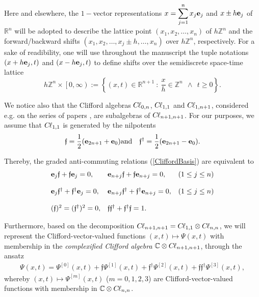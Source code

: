 \documentclass{elsarticle}
\newcommand{\BR}{{\mathbb R}}
\newcommand{\BC}{{\mathbb C}}
\newcommand{\BZ}{{\mathbb Z}}
\newcommand{\e}{{\bf e}}
\newcommand{\f}{{\mathfrak f}}
\newcommand{\cl}{C \kern -0.1em \ell}
\begin{document}
Here and elsewhere, the $1-$vector
representations $\displaystyle x=\sum_{j=1}^{n}x_j\e_j$ and $\displaystyle x\pm h
\e_j$ of $\BR^{n}$ will be adopted to describe
the lattice point $(x_1,x_2,\ldots,x_n)$ of $h\BZ^{n}$ and the
forward/backward shifts $(x_1,x_2,\ldots,x_j\pm h,\ldots, x_n)$ over
$h\BZ^n$, respectively. 
For a sake of readibility, one will use throughout the manuscript the tuple notations $(x+h\e_j,t)$ and $(x-h\e_j,t)$
to define shifts over the semidiscrete space-time lattice
$$h\BZ^n \times \left[0,\infty\right):=\left\{(x,t)\in \BR^{n+1}~:~\frac{x}{h}\in \BZ^n~~\wedge~~t\geq 0 \right\}.$$ 

We notice also that the Clifford algebras $\cl_{0,n}$, $\cl_{1,1}$ and $\cl_{1,n+1}$, considered e.g. on the series of papers \cite{CKS05,B06,FV16,FV17,BCBM20}, are subalgebras of $\cl_{n+1,n+1}$. For our purposes, we assume that $\cl_{1,1}$ is generated by the nilpotents
\begin{eqnarray}
	\label{WittBasis}	\f=\frac{1}{2}(\e_{2n+1}+\e_0) & \mbox{and} & \f^\dagger=\frac{1}{2}(\e_{2n+1}-\e_0).
\end{eqnarray} 

Thereby, the graded anti-commuting relations (\ref{CliffordBasis}) are equivalent to
\begin{eqnarray}
	\label{CliffordWittBasis}
	\begin{array}{lll}
		\e_j  \f+\f \e_j=0, & \e_{n+j} \f+\f \e_{n+j}=0, &(1\leq j\leq n)\\ \ \\
		\e_j  \f^\dagger+\f^\dagger \e_j=0, & \e_{n+j} \f^\dagger +\f^\dagger \e_{n+j}=0, &(1\leq j\leq n)\\ \ \\
		(\f)^2=(\f^\dagger)^2=0,& \f \f^\dagger +\f^\dagger \f=1. &
	\end{array}
\end{eqnarray}



Furthermore, based on the decomposition $\cl_{n+1,n+1}=\cl_{1,1}\otimes \cl_{n,n}$, we will represent the Clifford-vector-valued functions $(x,t)\mapsto \Psi(x,t)$ with membership in the {\it complexified Clifford algebra} $\BC\otimes\cl_{n+1,n+1}$, through the ansatz
\begin{eqnarray*}
	\Psi(x,t)=\Psi^{[0]}(x,t)+\f\Psi^{[1]}(x,t)+\f^\dagger \Psi^{[2]}(x,t)+\f\f^\dagger \Psi^{[3]}(x,t),
\end{eqnarray*}
whereby $(x,t)\mapsto\Psi^{[m]}(x,t)$ ($m=0,1,2,3$) are Clifford-vector-valued functions with membership in $\BC \otimes \cl_{n,n}$.
\end{document}
